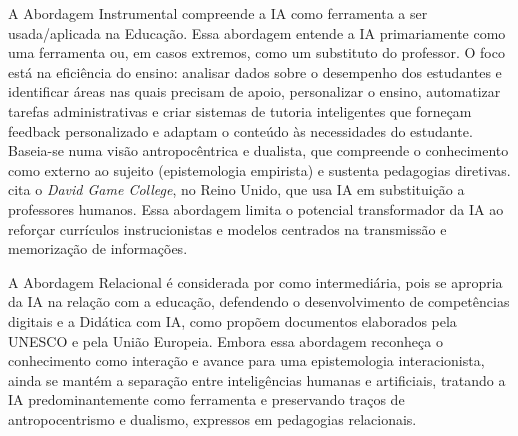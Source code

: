 \documentclass[portuguese]{textolivre}
\begin{document}
A Abordagem Instrumental compreende a IA como ferramenta a ser usada/aplicada na Educação. Essa abordagem entende a IA primariamente como uma ferramenta ou, em casos extremos, como um substituto do professor. O foco está na eficiência do ensino: analisar dados sobre o desempenho dos estudantes e identificar áreas nas quais precisam de apoio, personalizar o ensino, automatizar tarefas administrativas e criar sistemas de tutoria inteligentes que forneçam feedback personalizado e adaptam o conteúdo às necessidades do estudante. Baseia-se numa visão antropocêntrica e dualista, que compreende o conhecimento como externo ao sujeito (epistemologia empirista) e sustenta pedagogias diretivas. \textcite{schlemmer2024inteligencias} cita o \textit{David Game College}, no Reino Unido, que usa IA em substituição a professores humanos. Essa abordagem limita o potencial transformador da IA ao reforçar currículos instrucionistas e modelos centrados na transmissão e memorização de informações.

A Abordagem Relacional é considerada por \cite{schlemmer2024inteligencias} como intermediária, pois se apropria da IA na relação com a educação, defendendo o desenvolvimento de competências digitais e a Didática com IA, como propõem documentos elaborados pela UNESCO e pela União Europeia. Embora essa abordagem reconheça o conhecimento como interação e avance para uma epistemologia interacionista, ainda se mantém a separação entre inteligências humanas e artificiais, tratando a IA predominantemente como ferramenta e preservando traços de antropocentrismo e dualismo, expressos em pedagogias relacionais.
\end{document}
